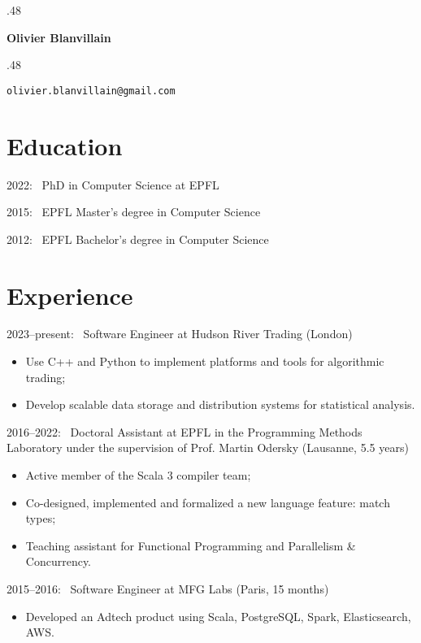 \documentclass[marginmode, 11pt]{res}
\newcommand{\centered}[1]{\moveleft.48\hoffset\centerline{#1}}
\begin{document}
\centered{\LARGE\textbf{Olivier Blanvillain}}
\centered{\texttt{olivier.blanvillain@gmail.com}}
\vspace{12pt}

\begin{resume}

\section{Education}

2022:~ PhD in Computer Science at EPFL

2015:~ EPFL Master's degree in Computer Science

2012:~ EPFL Bachelor's degree in Computer Science

\section{Experience}

2023--present:~ Software Engineer at Hudson River Trading (London)

\begin{itemize}
  \item Use C++ and Python to implement platforms and tools for algorithmic trading;
  \item Develop scalable data storage and distribution systems for statistical analysis.
\end{itemize}

2016--2022:~ Doctoral Assistant at EPFL in the Programming Methods Laboratory under the supervision of Prof. Martin Odersky (Lausanne, 5.5 years)

\begin{itemize}
  \item Active member of the Scala 3 compiler team;
  \item Co-designed, implemented and formalized a new language feature: match types;
  \item Teaching assistant for Functional Programming and Parallelism \& Concurrency.
\end{itemize}

2015--2016:~ Software Engineer at MFG Labs (Paris, 15 months)

\begin{itemize}
  \item Developed an Adtech product using Scala, PostgreSQL, Spark, Elasticsearch, AWS.
\end{itemize}


\end{resume}
\end{document}
